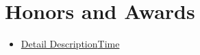 \section{Honors and Awards}
\begin{itemize}
      \item {}
            {\underline{Detail Description}}{\underline{Time}}
\end{itemize}